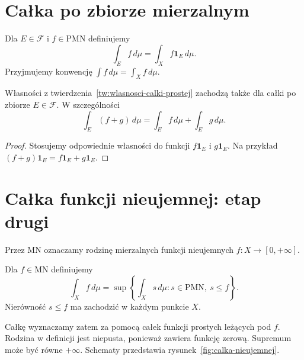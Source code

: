 \section{Całka po zbiorze mierzalnym}
\label{sec:calka-po-zbiorze}

\begin{definicja}
\label{def:calka-prostej-po-zbiorze}
Dla $E\in\mathcal{F}$ i $f\in\mathrm{PMN}$ definiujemy
\begin{equation}
  \int_E f\,d\mu=\int_X f\mathbf{1}_E\,d\mu.
  \label{eq:calka-po-zbiorze}
\end{equation}
Przyjmujemy konwencję $\int f\,d\mu=\int_X f\,d\mu$.
\end{definicja}

\begin{fakt}
\label{fakt:wlasnosci-calki-po-zbiorze}
Własności z twierdzenia~\ref{tw:wlasnosci-calki-prostej} zachodzą także
dla całki po zbiorze $E\in\mathcal{F}$. W szczególności
\[
  \int_E(f+g)\,d\mu=\int_E f\,d\mu+\int_E g\,d\mu.
\]
\end{fakt}

\begin{proof}
Stosujemy odpowiednie własności do funkcji $f\mathbf{1}_E$
i $g\mathbf{1}_E$. Na przykład
$(f+g)\mathbf{1}_E=f\mathbf{1}_E+g\mathbf{1}_E$.
\end{proof}

\section{Całka funkcji nieujemnej: etap drugi}
\label{sec:calka-nieujemnej-etap-drugi}

Przez $\mathrm{MN}$ oznaczamy rodzinę mierzalnych funkcji nieujemnych
$f\colon X\to[0,+\infty]$.

\begin{definicja}
\label{def:calka-nieujemnej}
Dla $f\in\mathrm{MN}$ definiujemy
\begin{equation}
  \int_X f\,d\mu
  =\sup\left\{\int_X s\,d\mu:
       s\in\mathrm{PMN},\ s\leq f\right\}.
  \label{eq:calka-nieujemnej-supremum}
\end{equation}
Nierówność $s\leq f$ ma zachodzić w każdym punkcie $X$.
\end{definicja}

Całkę wyznaczamy zatem za pomocą całek funkcji prostych leżących pod $f$.
Rodzina w definicji jest niepusta, ponieważ zawiera funkcję zerową.
Supremum może być równe $+\infty$.
Schematy przedstawia rysunek~\ref{fig:calka-nieujemnej}.

